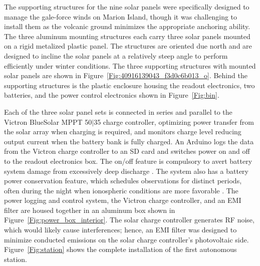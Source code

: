 The supporting structures for the nine solar panels were specifically designed to manage the gale-force winds on Marion Island, though it was challenging to install them as the volcanic ground minimizes the appropriate anchoring ability.  The three aluminum mounting structures  each carry three solar panels mounted on a rigid metalized plastic panel. The structures are oriented due north and are designed to incline the solar panels at a relatively steep angle to perform efficiently under winter conditions. The three supporting structures with mounted solar panels are shown in Figure~\ref{Fig:40916139043_f3d0c6b013_o}. Behind the supporting structures is the plastic enclosure housing the readout electronics, two batteries, and the power control electronics shown in Figure~\ref{Fig:bin}.  

Each of the three solar panel sets is connected in series and parallel  to the Victron BlueSolar MPPT 50$\vert$35 charge controller, optimizing power transfer from the solar array when charging is required, and monitors charge level reducing output current when the battery bank is fully charged. An Arduino logs the data from the Victron charge controller to an SD card and switches power on and off to the readout electronics box. The on/off feature is compulsory to avert battery system damage from excessively deep discharge . The system also has a battery power conservation feature, which schedules observations for distinct periods, often during the night when ionospheric conditions are more favorable . The power logging and control system, the Victron charge controller, and an EMI filter are housed together in an aluminum box shown in Figure~\ref{Fig:power_box_interior}. The solar charge controller generates RF noise, which would likely cause interferences; hence, an EMI filter was designed to minimize conducted emissions on the solar charge controller's photovoltaic side. Figure~\ref{Fig:station} shows the complete installation of the first autonomous station.

